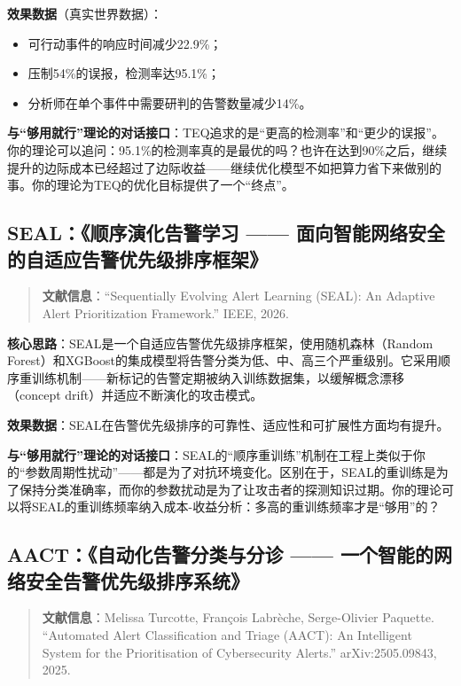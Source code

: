 \documentclass[11pt,a4paper]{article}
\begin{document}
\textbf{效果数据}（真实世界数据）：
\begin{itemize}
    \item 可行动事件的响应时间减少22.9\%；
    \item 压制54\%的误报，检测率达95.1\%；
    \item 分析师在单个事件中需要研判的告警数量减少14\%。
\end{itemize}

\textbf{与“够用就行”理论的对话接口}：TEQ追求的是“更高的检测率”和“更少的误报”。你的理论可以追问：95.1\%的检测率真的是最优的吗？也许在达到90\%之后，继续提升的边际成本已经超过了边际收益——继续优化模型不如把算力省下来做别的事。你的理论为TEQ的优化目标提供了一个“终点”。

\subsection{SEAL：《顺序演化告警学习 —— 面向智能网络安全的自适应告警优先级排序框架》}

\begin{quote}
\textbf{文献信息}：“Sequentially Evolving Alert Learning (SEAL): An Adaptive Alert Prioritization Framework.” IEEE, 2026.
\end{quote}

\textbf{核心思路}：SEAL是一个自适应告警优先级排序框架，使用随机森林（Random Forest）和XGBoost的集成模型将告警分类为低、中、高三个严重级别。它采用顺序重训练机制——新标记的告警定期被纳入训练数据集，以缓解概念漂移（concept drift）并适应不断演化的攻击模式。

\textbf{效果数据}：SEAL在告警优先级排序的可靠性、适应性和可扩展性方面均有提升。

\textbf{与“够用就行”理论的对话接口}：SEAL的“顺序重训练”机制在工程上类似于你的“参数周期性扰动”——都是为了对抗环境变化。区别在于，SEAL的重训练是为了保持分类准确率，而你的参数扰动是为了让攻击者的探测知识过期。你的理论可以将SEAL的重训练频率纳入成本-收益分析：多高的重训练频率才是“够用”的？

\subsection{AACT：《自动化告警分类与分诊 —— 一个智能的网络安全告警优先级排序系统》}

\begin{quote}
\textbf{文献信息}：Melissa Turcotte, François Labrèche, Serge-Olivier Paquette. “Automated Alert Classification and Triage (AACT): An Intelligent System for the Prioritisation of Cybersecurity Alerts.” arXiv:2505.09843, 2025.
\end{quote}
\end{document}
